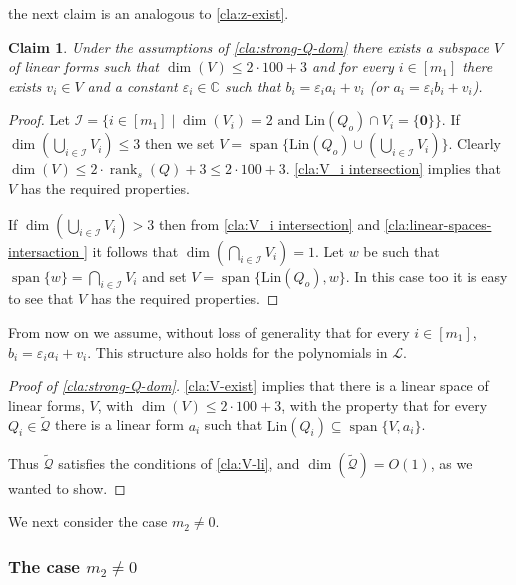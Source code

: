 \documentclass[10pt,a4paper]{article}
\newtheorem{claim}[theorem]{Claim}
\def\rank{\operatorname{rank}}
\renewcommand{\vec}[1]{{\mathbf{#1}}}
\renewcommand{\C}{\mathbb{C}}
\newcommand{\cI}{{\mathcal{I}}}
\newcommand{\calL}{{\mathcal{L}}}
\newcommand{\cQ}{{\mathcal{Q}}}
\newcommand{\spn}[1]{\operatorname{span}\{{#1}\}}
\def\epsilon{\varepsilon}
\newcommand{\rkq}{100}
\newcommand{\MS}{\text{Lin}}
\begin{document}
the next claim is an analogous to \autoref{cla:z-exist}.


\begin{claim}\label{cla:V-exist}
Under the assumptions of \autoref{cla:strong-Q-dom} there exists a subspace $V$ of linear forms such that $\dim(V)\leq 2\cdot\rkq+ 3$ and  for every $i \in [m_1]$ there exists $v_i\in V$ and a constant $\epsilon_i\in\C$ such that $b_i = \epsilon_i a_i +v_i$ (or $a_i = \epsilon_i b_i +v_i$).
\end{claim}

\begin{proof}



Let $\cI=\{i\in[m_1] \mid \dim(V_i)=2 \text{ and } \MS(Q_o)\cap V_i = \{\vec{0}\} \}$. 
If $\dim(\bigcup_{i\in \cI} V_i) \leq 3$ then we set $V = \spn{\MS(Q_o)  \cup (\bigcup_{i\in \cI} V_i)}$. Clearly $\dim(V)\leq 2\cdot \rank_s(Q)+3\leq 2\cdot \rkq+3$.  \autoref{cla:V_i intersection}  implies that $V$ has the required properties. 

If $\dim(\bigcup_{i\in \cI} V_i) > 3$ then from \autoref{cla:V_i intersection} and \autoref{cla:linear-spaces-intersaction }
it follows that $\dim(\bigcap_{i\in \cI} V_i) =1$.
Let $w$ be such that $\spn{w}=\bigcap_{i\in \cI} V_i$ and set $V = \spn{\MS(Q_o),w}$. 
In this case too it is easy to see  that $V$ has the required properties.

\end{proof}







From now on we assume, without loss of generality that for every $i\in [m_1]$, $b_i = \epsilon_i a_i +v_i$. This structure also holds for the polynomials in $\calL$.

\begin{proof}[Proof of \autoref{cla:strong-Q-dom}]
	\autoref{cla:V-exist} implies that there is a linear space of linear forms, $V$, with $\dim(V) \leq 2\cdot\rkq+ 3$, with the property that for every $Q_i \in \tilde{\cQ}$  there is a linear form $a_i$ such that $\MS(Q_i) \subseteq \spn{V,a_i}$. 
	
	Thus $\tilde{\cQ}$ satisfies the conditions of \autoref{cla:V-li}, and $\dim(\tilde{\cQ}) = O(1)$, as we wanted to show.
\end{proof}

We next consider the case $m_2\neq 0$.

\subsubsection{The case $m_2\neq 0$}
\end{document}
